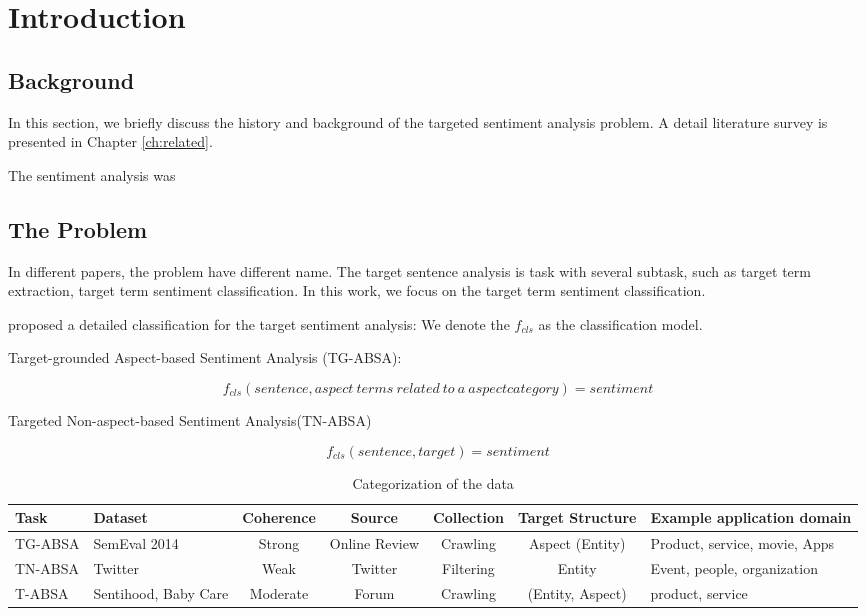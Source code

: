 \documentclass[fyp]{socreport}
\begin{document}
\listoffigures 
\listoftables
\tableofcontents 

\chapter{Introduction}  
 

\section{Background}
In this section, we briefly discuss the history and background of the targeted sentiment analysis problem.  A detail literature survey is presented in 
Chapter \ref{ch:related}.

The sentiment analysis was


\section{The Problem}
In different papers, the problem have different name. The target sentence analysis is task with several subtask, such as target term extraction, target term sentiment classification. In this work, we focus on the target term sentiment classification.


\cite{pei2019targeted} proposed a detailed classification for the target sentiment analysis: 
We denote the $f_{cls}$ as the classification model.

Target-grounded Aspect-based Sentiment Analysis (TG-ABSA):

\begin{equation}
    f_{cls}(sentence,aspect\ terms\ related\ to\ a\ aspect category) =sentiment
\end{equation}

Targeted Non-aspect-based Sentiment Analysis(TN-ABSA)

\begin{equation}
f_{cls}(sentence,target)=sentiment
\end{equation}\label{TSA_definition}



\begin{table}
    \centering
    \caption{Categorization of the data}
    \label{tab:autometrics}
    {\small
    \begin{tabular}{@{}l|p{0.72in}|c|c|c|c|p{0.8in}}
    \toprule
    Task & Dataset & Coherence  & Source & Collection & Target Structure & Example application domain\\
    \hline
    TG-ABSA & SemEval 2014 & Strong & Online Review & Crawling & Aspect (Entity) & Product, service, movie, Apps   \\
    TN-ABSA & Twitter & Weak & Twitter & Filtering & Entity & Event, people, organization   \\
    T-ABSA & Sentihood, Baby Care & Moderate & Forum& Crawling & (Entity, Aspect) & product, service   \\
    \bottomrule
    \end{tabular}
    }
    \end{table}
\end{document}
